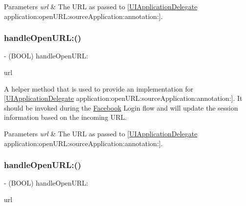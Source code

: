 \begin{DoxyParams}{Parameters}
{\em url} & The U\+RL as passed to \mbox{[}\hyperlink{classUIApplicationDelegate-p}{U\+I\+Application\+Delegate} application\+:open\+U\+R\+L\+:source\+Application\+:annotation\+:\mbox{]}. \\
\hline
\end{DoxyParams}
\mbox{\label{interfaceFBSession_a99548fc3fd7dc7f5b8dc24019be88000}} 
\subsubsection{\texorpdfstring{handle\+Open\+U\+R\+L\+:()}{handleOpenURL:()}\hspace{0.1cm}{\footnotesize\ttfamily [2/5]}}
{\footnotesize\ttfamily -\/ (B\+O\+OL) handle\+Open\+U\+R\+L\+: \begin{DoxyParamCaption}\item[{(N\+S\+U\+RL $\ast$)}]{url }\end{DoxyParamCaption}}

A helper method that is used to provide an implementation for \mbox{[}\hyperlink{classUIApplicationDelegate-p}{U\+I\+Application\+Delegate} application\+:open\+U\+R\+L\+:source\+Application\+:annotation\+:\mbox{]}. It should be invoked during the \hyperlink{interfaceFacebook}{Facebook} Login flow and will update the session information based on the incoming U\+RL.


\begin{DoxyParams}{Parameters}
{\em url} & The U\+RL as passed to \mbox{[}\hyperlink{classUIApplicationDelegate-p}{U\+I\+Application\+Delegate} application\+:open\+U\+R\+L\+:source\+Application\+:annotation\+:\mbox{]}. \\
\hline
\end{DoxyParams}
\mbox{\label{interfaceFBSession_a99548fc3fd7dc7f5b8dc24019be88000}} 
\subsubsection{\texorpdfstring{handle\+Open\+U\+R\+L\+:()}{handleOpenURL:()}\hspace{0.1cm}{\footnotesize\ttfamily [3/5]}}
{\footnotesize\ttfamily -\/ (B\+O\+OL) handle\+Open\+U\+R\+L\+: \begin{DoxyParamCaption}\item[{(N\+S\+U\+RL $\ast$)}]{url }\end{DoxyParamCaption}}

